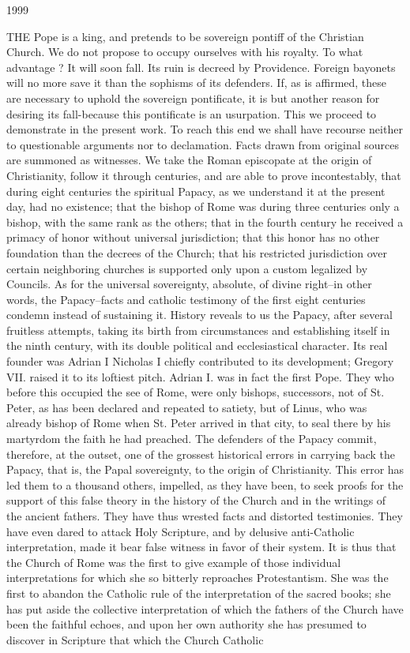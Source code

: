 1999


THE Pope is a king, and pretends to be sovereign pontiff of the Christian Church. We do not propose to occupy ourselves with his royalty. To what advantage ? It will soon fall. Its ruin is decreed by Providence. Foreign bayonets will no more save it than the sophisms of its defenders. If, as is affirmed, these are necessary to uphold the sovereign pontificate, it is but another reason for desiring its fall-because this pontificate is an usurpation. This we proceed to demonstrate in the present work. To reach this end we shall have recourse neither to questionable arguments nor to declamation. Facts drawn from original sources are summoned as witnesses. We take the Roman episcopate at the origin of Christianity, follow it through centuries, and are able to prove incontestably, that during eight centuries the spiritual Papacy, as we understand it at the present day, had no existence; that the bishop of Rome was during three centuries only a bishop, with the same rank as the others; that in the fourth century he received a primacy of honor without universal jurisdiction; that this honor has no other foundation than the decrees of the Church; that his restricted jurisdiction over certain neighboring churches is supported only upon a custom legalized by Councils. As for the universal sovereignty, absolute, of divine right--in other words, the Papacy--facts and catholic testimony of the first eight centuries condemn instead of sustaining it. History reveals to us the Papacy, after several fruitless attempts, taking its birth from circumstances and establishing itself in the ninth century, with its double political and ecclesiastical character. Its real founder was Adrian I Nicholas I chiefly contributed to its development; Gregory VII. raised it to its loftiest pitch. Adrian I. was in fact the first Pope. They who before this occupied the see of Rome, were only bishops, successors, not of St. Peter, as has been declared and repeated to satiety, but of Linus, who was already bishop of Rome when St. Peter arrived in that city, to seal there by his martyrdom the faith he had preached. The defenders of the Papacy commit, therefore, at the outset, one of the grossest historical errors in carrying back the Papacy, that is, the Papal sovereignty, to the origin of Christianity. This error has led them to a thousand others, impelled, as they have been, to seek proofs for the support of this false theory in the history of the Church and in the writings of the ancient fathers. They have thus wrested facts and distorted testimonies. They have even dared to attack Holy Scripture, and by delusive anti-Catholic interpretation, made it bear false witness in favor of their system. It is thus that the Church of Rome was the first to give example of those individual interpretations for which she so bitterly reproaches Protestantism. She was the first to abandon the Catholic rule of the interpretation of the sacred books; she has put aside the collective interpretation of which the fathers of the Church have been the faithful echoes, and upon her own authority she has presumed to discover in Scripture that which the Church Catholic 